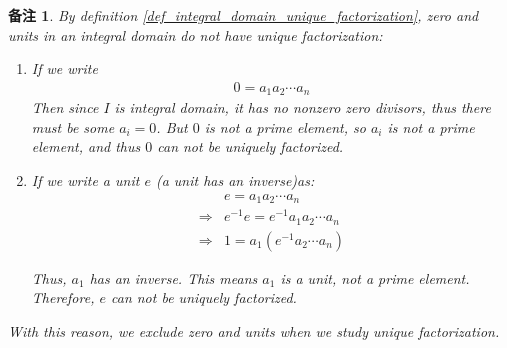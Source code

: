 \documentclass[utf8]{ctexbook}
\newtheorem{memo}{备注}[section]
\begin{document}
\begin{memo}
By definition \ref{def_integral_domain_unique_factorization}, zero and units in an integral domain do not have unique factorization:
\begin{enumerate}
\item{If we write 
\begin{align*}
0 = a_1 a_2 \cdots a_n
\end{align*}
Then since $I$ is integral domain, it has no nonzero zero divisors, thus there must be some $a_i = 0$. But $0$ is not a prime element, so $a_i$ is not a prime element, and thus $0$ can not be uniquely factorized.
}
\item{If we write a unit $e$ (a unit has an inverse)as:
\begin{align*}
& e = a_1 a_2 \cdots a_n \\
\Longrightarrow & e^{-1} e = e^{-1}  a_1 a_2 \cdots a_n \\
\Longrightarrow & 1 = a_1 (e^{-1}  a_2 \cdots a_n )
\end{align*}

Thus, $a_1$ has an inverse. This means $a_1$ is a unit, not a prime element. Therefore, $e$ can not be uniquely factorized.
}
\end{enumerate}

With this reason, we exclude zero and units when we study unique factorization.
\end{memo}
\end{document}

